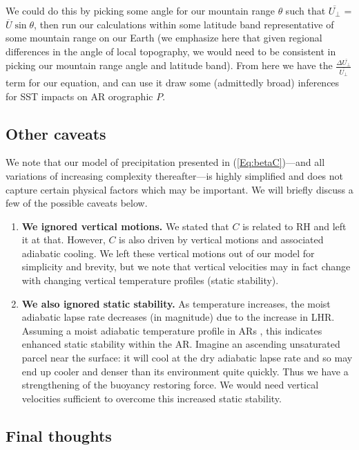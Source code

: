 \documentclass[letterpaper,12pt]{article}
\begin{document}
We could do this by picking some angle for our mountain range $\theta$ such that $\overline{U_{\bot}}$ = $\overline{U}\sin\theta$, then run our calculations within some latitude band representative of some mountain range on our Earth (we emphasize here that given regional differences in the angle of local topography, we would need to be consistent in picking our mountain range angle and latitude band). From here we have the  $\frac{\Delta \overline{U_\bot}}{\overline{U_\bot}}$ term for our equation, and can use it draw some (admittedly broad) inferences for SST impacts on AR orographic $P$. 


\subsection{Other caveats}

We note that our model of precipitation presented in (\ref{Eq:betaC})---and all variations of increasing complexity thereafter---is highly simplified and does not capture certain physical factors which may be important. We will briefly discuss a few of the possible caveats below. 
\begin{enumerate}
    \item \textbf{We ignored vertical motions.} We stated that $C$ is related to RH and left it at that. However, $C$ is also driven by vertical motions and associated adiabatic cooling. We left these vertical motions out of our model for simplicity and brevity, but we note that vertical velocities may in fact change with changing vertical temperature profiles (static stability).
    \item \textbf{We also ignored static stability.} As temperature increases, the moist adiabatic lapse rate decreases (in magnitude) due to the increase in LHR. Assuming a moist adiabatic temperature profile in ARs \cite{Neiman2008MeteorologicalObservations}, this indicates enhanced static stability within the AR. Imagine an ascending unsaturated parcel near the surface: it will cool at the dry adiabatic lapse rate and so may end up cooler and denser than its environment quite quickly. Thus we have a strengthening of the buoyancy restoring force. We would need vertical velocities sufficient to overcome this increased static stability.
\end{enumerate}

\subsection{Final thoughts}

\newpage


\end{document}

